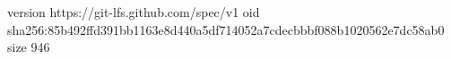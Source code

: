 version https://git-lfs.github.com/spec/v1
oid sha256:85b492ffd391bb1163e8d440a5df714052a7cdecbbbf088b1020562e7dc58ab0
size 946
